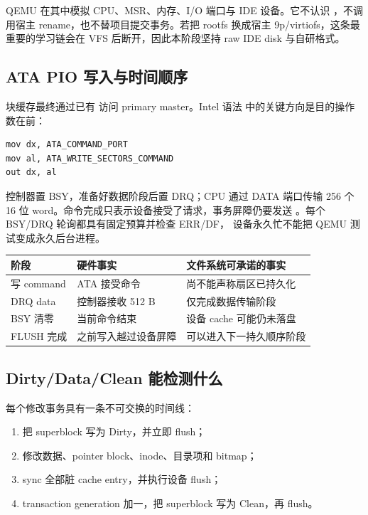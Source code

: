 QEMU 在其中模拟 CPU、MSR、内存、I/O 端口与 IDE 设备。它不认识
，不调用宿主 rename，也不替项目提交事务。若把 rootfs
换成宿主 9p/virtiofs，这条最重要的学习链会在 VFS 后断开，因此本阶段坚持
raw IDE disk 与自研格式。

\subsection{ATA PIO 写入与时间顺序}

块缓存最终通过已有  访问 primary master。Intel 语法
中的关键方向是目的操作数在前：

\begin{lstlisting}[language={[x86masm]Assembler},caption={概念化的 ATA 命令提交，实际常量均使用具名定义}]
mov dx, ATA_COMMAND_PORT
mov al, ATA_WRITE_SECTORS_COMMAND
out dx, al
\end{lstlisting}

控制器置 BSY，准备好数据阶段后置 DRQ；CPU 通过 DATA 端口传输 256 个
16 位 word。命令完成只表示设备接受了请求，事务屏障仍要发送
。每个 BSY/DRQ 轮询都具有固定预算并检查 ERR/DF，
设备永久忙不能把 QEMU 测试变成永久后台进程。

\begin{longtable}{L{0.17\textwidth}L{0.29\textwidth}L{0.41\textwidth}}
\toprule
阶段 & 硬件事实 & 文件系统可承诺的事实\\
\midrule
写 command & ATA 接受命令 & 尚不能声称扇区已持久化\\
DRQ data & 控制器接收 512 B & 仅完成数据传输阶段\\
BSY 清零 & 当前命令结束 & 设备 cache 可能仍未落盘\\
FLUSH 完成 & 之前写入越过设备屏障 & 可以进入下一持久顺序阶段\\
\bottomrule
\end{longtable}

\subsection{Dirty/Data/Clean 能检测什么}

每个修改事务具有一条不可交换的时间线：

\begin{enumerate}
  \item 把 superblock 写为 Dirty，并立即 flush；
  \item 修改数据、pointer block、inode、目录项和 bitmap；
  \item sync 全部脏 cache entry，并执行设备 flush；
  \item transaction generation 加一，把 superblock 写为 Clean，再 flush。
\end{enumerate}

